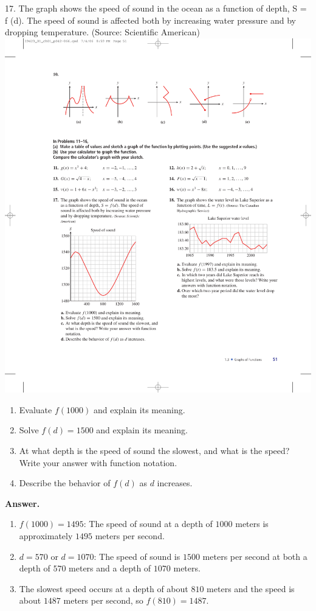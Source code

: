 \documentclass[10pt,]{book}
\theoremstyle{plain}
\theoremstyle{definition}
\theoremstyle{definition}
\theoremstyle{definition}
\theoremstyle{definition}
\numberwithin{equation}{part}
\begin{document}
\par\smallskip\noindent
\begin{exerciselist}
\item[17.]\hypertarget{exercise-174}{}The graph shows the speed of sound in the ocean as a function of depth, S = f (d). The speed of sound is affected both by increasing water pressure and by dropping temperature. (Source: Scientific American) \includegraphics[width=0.5\linewidth]{images/fig-ex-1-3-17}
 \leavevmode%
\begin{enumerate}[label=*\alph**]
\item\hypertarget{li-716}{}Evaluate \(f (1000)\) and explain its meaning.%
\item\hypertarget{li-717}{}Solve \(f (d) = 1500\) and explain its meaning.%
\item\hypertarget{li-718}{}At what depth is the speed of sound the slowest, and what is the speed? Write your answer with function notation.%
\item\hypertarget{li-719}{}Describe the behavior of \(f (d)\) as \(d\) increases.%
\end{enumerate}
%
\par\smallskip
\par\smallskip
\noindent\textbf{Answer.}\hypertarget{answer-101}{}\quad
\leavevmode%
\begin{enumerate}[label=*\alph**]
\item\hypertarget{li-720}{}\(f (1000) = 1495\): The speed of sound at a depth of \(1000\) meters is approximately \(1495\) meters per second.%
\item\hypertarget{li-721}{}\(d = 570\) or \(d = 1070\): The speed of sound is \(1500\) meters per second at both a depth of \(570\) meters and a depth of \(1070\) meters.%
\item\hypertarget{li-722}{}The slowest speed occurs at a depth of about \(810\) meters and the speed is about \(1487\) meters per second, so \(f (810) = 1487\).%

\end{enumerate}
\end{exerciselist}
\end{document}
